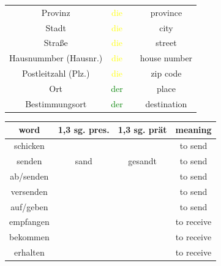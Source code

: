 \begin{center}
\begin{tabular}{|c|c|c|c|}
        Provinz               & \textcolor{yellow}{die} &                                          & province                \\
        Stadt                 & \textcolor{yellow}{die} &                                          & city                    \\
        Straße                & \textcolor{yellow}{die} &                                          & street                  \\
        Hausnummber (Hausnr.) & \textcolor{yellow}{die} &                                          & house number            \\
        Postleitzahl (Plz.)   & \textcolor{yellow}{die} &                                          & zip code                \\
        \hline
        Ort                   & \textcolor{green}{der}  &                                          & place                   \\
        Bestimmungsort        & \textcolor{green}{der}  &                                          & destination             \\
        \hline
    \end{tabular}
\end{center}

\begin{center}
    \begin{tabular}{|c|c|c|c|}
        \rowcolor{gray}
        word      & 1,3 sg. pres. & 1,3 sg. prät & meaning    \\
        \hline
        schicken  &               &              & to send    \\
        senden    & sand          & gesandt      & to send    \\
        ab/senden &               &              & to send    \\
        versenden &               &              & to send    \\
        auf/geben &               &              & to send    \\
        \hline
        empfangen &               &              & to receive \\
        bekommen  &               &              & to receive \\
        erhalten  &               &              & to receive \\
        \hline
    \end{tabular}
\end{center}

